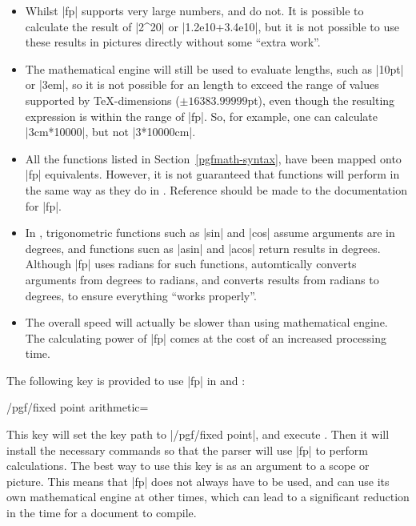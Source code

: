 \begin{itemize}
	
  \item 
  
  Whilst |fp| supports very large numbers, \pgfname{} and
  \tikzname{} do not. It is possible to calculate the result of 
  |2^20| or |1.2e10+3.4e10|, but it is not possible to use these
  results in pictures directly without some ``extra work''.
  
  \item
  
  The \pgfname{} mathematical engine will still be used to evaluate
  lengths, such as |10pt| or |3em|, so it is not possible for an
  length to exceed the range of values supported by 
  \TeX-dimensions ($\pm16383.99999$pt), even though the resulting 
  expression is within the range of |fp|. So, for example, one can
  calculate |3cm*10000|, but not |3*10000cm|.
  
  \item
  
  All the functions listed in Section~\ref{pgfmath-syntax}, have been
  mapped onto |fp| equivalents. However, it is not guaranteed that
  functions will perform in the same way as they do 
  in \pgfname. Reference should be made to the documentation for |fp|.
  
  \item
  
  In \pgfname, trigonometric functions such as |sin| and |cos| assume 
  arguments are in degrees, and functions sucn as |asin| and |acos|
  return results in degrees. Although |fp| uses radians for such
  functions, \pgfname{} automtically converts arguments from degrees 
  to radians, and converts results from radians to degrees, to ensure 
  everything ``works properly''.
   
  \item
  
  The overall speed will actually be slower than using 
  \pgfname{} mathematical engine. The calculating power of |fp| 
  comes at the cost of an increased processing time.
  
  
\end{itemize}
  
  The following key is provided to use |fp| in \pgfname{} 
  and \tikzname:
  
\begin{key}{/pgf/fixed point arithmetic=}

  This key will set the key path to |/pgf/fixed point|, and 
  execute . Then it will install the necessary 
  commands so that the \pgfname{} parser will use |fp| to perform 
  calculations. 
  The best way to use this key is as an argument to a scope or 
  picture. This means that |fp| does not always have to be used, 
  and \pgfname{} can use its own mathematical engine at other times, 
  which can lead to a significant reduction in the time for a document 
  to compile.
  
\end{key}

